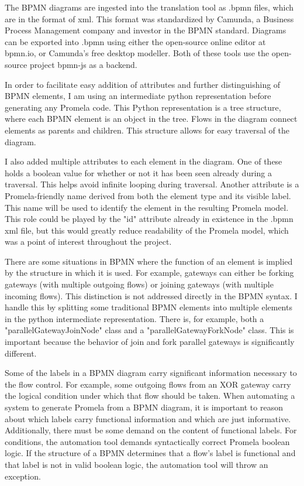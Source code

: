
The BPMN diagrams are ingested into the translation tool as .bpmn files, which are in the format of xml. This format was standardized by Camunda, a Business Process Management company and investor in the BPMN standard. Diagrams can be exported into .bpmn using either the open-source online editor at bpmn.io, or Camunda's free desktop modeller. Both of these tools use the open-source project bpmn-js as a backend.

In order to facilitate easy addition of attributes and further distinguishing of BPMN elements, I am using an intermediate python representation before generating any Promela code. This Python representation is a tree structure, where each BPMN element is an object in the tree. Flows in the diagram connect elements as parents and children. This structure allows for easy traversal of the diagram.

I also added multiple attributes to each element in the diagram. One of these holds a boolean value for whether or not it has been seen already during a traversal. This helps avoid infinite looping during traversal. Another attribute is a Promela-friendly name derived from both the element type and its visible label. This name will be used to identify the element in the resulting Promela model. This role could be played by the "id" attribute already in existence in the .bpmn xml file, but this would greatly reduce readability of the Promela model, which was a point of interest throughout the project.

There are some situations in BPMN where the function of an element is implied by the structure in which it is used. For example, gateways can either be forking gateways (with multiple outgoing flows) or joining gateways (with multiple incoming flows). This distinction is not addressed directly in the BPMN syntax. I handle this by splitting some traditional BPMN elements into multiple elements in the python intermediate representation. There is, for example, both a "parallelGatewayJoinNode" class and a "parallelGatewayForkNode" class. This is important because the behavior of join and fork parallel gateways is significantly different.

Some of the labels in a BPMN diagram carry significant information necessary to the flow control. For example, some outgoing flows from an XOR gateway carry the logical condition under which that flow should be taken. When automating a system to generate Promela from a BPMN diagram, it is important to reason about which labels carry functional information and which are just informative. Additionally, there must be some demand on the content of functional labels. For conditions, the automation tool demands syntactically correct Promela boolean logic. If the structure of a BPMN determines that a flow's label is functional and that label is not in valid boolean logic, the automation tool will throw an exception.

